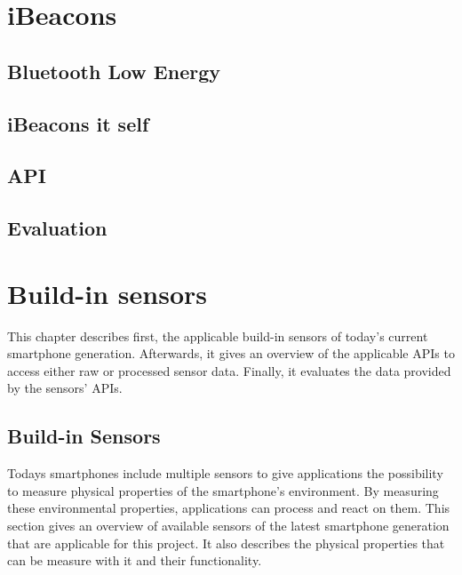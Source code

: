 \chapter{iBeacons}

\section{Bluetooth Low Energy}

\section{iBeacons it self}

\section{API}

\section{Evaluation}



\chapter{Build-in sensors} \label{chap:sensors} %

This chapter describes first, the applicable build-in sensors of today's current smartphone generation.
Afterwards, it gives an overview of the applicable \acsp{API} to access either raw or processed sensor data.
Finally, it evaluates the data provided by the sensors' \acsp{API}.


\section{Build-in Sensors}

Todays smartphones include multiple sensors to give applications the possibility to measure physical properties of the smartphone's environment.
By measuring these environmental properties, applications can process and react on them.
This section gives an overview of available sensors of the latest smartphone generation that are applicable for this project.
It also describes the physical properties that can be measure with it and their functionality.


